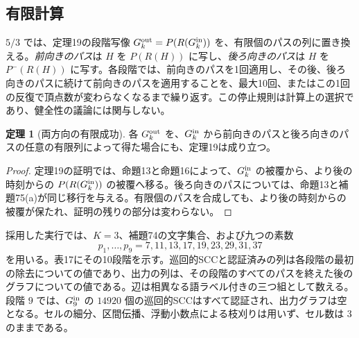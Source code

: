 \documentclass[11pt,reqno]{amsart}
\theoremstyle{definition}
\newtheorem{theorem}{定理}
\theoremstyle{definition}
\theoremstyle{remark}
\begin{document}
\subsection{有限計算}\label{sec:F.3}

\(5/3\) では、定理19の段階写像 \(G_k^{\rm out}=P(R(G_k^{\rm in}))\) を、有限個のパスの列に置き換える。\emph{前向きのパス}は \(H\) を \(P(R(H))\) に写し、\emph{後ろ向きのパス}は \(H\) を \(P^-(R(H))\) に写す。各段階では、前向きのパスを1回適用し、その後、後ろ向きのパスに続けて前向きのパスを適用することを、最大10回、またはこの1回の反復で頂点数が変わらなくなるまで繰り返す。この停止規則は計算上の選択であり、健全性の議論には関与しない。

\begin{samepage}
\begin{theorem}[両方向の有限成功]\leavevmode\label{thm:76}
各 \(G_k^{\rm out}\) を、\(G_k^{\rm in}\) から前向きのパスと後ろ向きのパスの任意の有限列によって得た場合にも、定理19は成り立つ。
\label{thm-end:76}
\end{theorem}
\end{samepage}

\begin{proof}\leavevmode\label{proof:76}
定理19の証明では、命題13と命題16によって、\(G_k^{\rm in}\) の被覆から、より後の時刻からの \(P(R(G_k^{\rm in}))\) の被覆へ移る。後ろ向きのパスについては、命題13と補題75(a)が同じ移行を与える。有限個のパスを合成しても、より後の時刻からの被覆が保たれ、証明の残りの部分は変わらない。\qedhere
\end{proof}

採用した実行では、\(K=3\)、補題74の文字集合、および九つの素数
\[
p_1,\ldots,p_9=7,11,13,17,19,23,29,31,37
\]
を用いる。表17にその10段階を示す。巡回的SCCと認証済みの列は各段階の最初の除去についての値であり、出力の列は、その段階のすべてのパスを終えた後のグラフについての値である。辺は相異なる語ラベル付きの三つ組として数える。段階 \(9\) では、\(G_9^{\rm in}\) の \(14920\) 個の巡回的SCCはすべて認証され、出力グラフは空となる。セルの細分、区間伝播、浮動小数点による枝刈りは用いず、セル数は \(3\) のままである。
\end{document}
